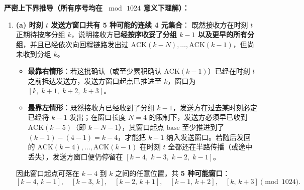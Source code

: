 \textbf{严密上下界推导（所有序号均在 $\bmod\, 1024$ 意义下理解）：}
\begin{enumerate}
\item \textbf{(a) 时刻 $t$ 发送方窗口共有 5 种可能的连续 4 元集合}：
  既然接收方在时刻 $t$ 正期待按序分组 $k$，说明接收方\textbf{已经按序收妥了分组 $k-1$ 以及更早的所有分组}，并且已经依次向回程链路发出过 $\mathrm{ACK}(k-N), \dots, \mathrm{ACK}(k-1)$，但尚未收到分组 $k$。
  \begin{itemize}
  \item \textbf{最靠右情形}：若这批确认（或至少累积确认 $\mathrm{ACK}(k-1)$）已经在时刻 $t$ 之前抵达发送方，发送方窗口起点已推进至 $k$，窗口为 $[k,\; k+1,\; k+2,\; k+3]$。
  \item \textbf{最靠左情形}：既然接收方已经收到了分组 $k-1$，发送方在过去某时刻必定已经将 $k-1$ 发出；在窗口长度 $N = 4$ 的限制下，发送方必须早已收到 $\mathrm{ACK}(k-5)$（即 $k-N-1$），其窗口起点 $\mathrm{base}$ 至少推进到了 $(k-1) - (4-1) = k - 4$，才能把 $k-1$ 纳入发送窗口。若随后发回的 $\mathrm{ACK}(k-4), \dots, \mathrm{ACK}(k-1)$ 在时刻 $t$ 全都还在半路传播（或途中丢失），发送方窗口便仍停留在 $[k-4,\; k-3,\; k-2,\; k-1]$。
  \end{itemize}
  因此窗口起点可落在 $k-4$ 到 $k$ 之间的任意位置，共 \textbf{5 种可能窗口}：
  \[
  [k-4,\,k-1],\quad [k-3,\,k],\quad [k-2,\,k+1],\quad [k-1,\,k+2],\quad [k,\,k+3] \pmod{1024}.
  \tag{A2.1}
  \]


\end{enumerate}
